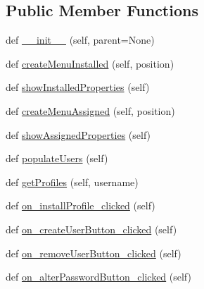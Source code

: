 \subsection*{Public Member Functions}
\begin{DoxyCompactItemize}
\item 
def \mbox{\hyperlink{class_dsg_tools_1_1_user_tools_1_1user__profiles_1_1_manage_user_profiles_a1887fc986ce95413f9257b52fe64fbe0}{\+\_\+\+\_\+init\+\_\+\+\_\+}} (self, parent=None)
\item 
def \mbox{\hyperlink{class_dsg_tools_1_1_user_tools_1_1user__profiles_1_1_manage_user_profiles_a65349a082dd0ecd96d12504f393b9157}{create\+Menu\+Installed}} (self, position)
\item 
def \mbox{\hyperlink{class_dsg_tools_1_1_user_tools_1_1user__profiles_1_1_manage_user_profiles_a1beec4e431f3526c6f4efb5bcefca57d}{show\+Installed\+Properties}} (self)
\item 
def \mbox{\hyperlink{class_dsg_tools_1_1_user_tools_1_1user__profiles_1_1_manage_user_profiles_a72cd95fef31bdbb1a3cad168c691f9d8}{create\+Menu\+Assigned}} (self, position)
\item 
def \mbox{\hyperlink{class_dsg_tools_1_1_user_tools_1_1user__profiles_1_1_manage_user_profiles_a37b95df3524d16d437744c9a835251dd}{show\+Assigned\+Properties}} (self)
\item 
def \mbox{\hyperlink{class_dsg_tools_1_1_user_tools_1_1user__profiles_1_1_manage_user_profiles_aa6fc0358355aa3103a1186f1ee803757}{populate\+Users}} (self)
\item 
def \mbox{\hyperlink{class_dsg_tools_1_1_user_tools_1_1user__profiles_1_1_manage_user_profiles_a7a13c12726e9d7a6cb5d4692ab812be0}{get\+Profiles}} (self, username)
\item 
def \mbox{\hyperlink{class_dsg_tools_1_1_user_tools_1_1user__profiles_1_1_manage_user_profiles_a026d117030c803f78c6d5896e7a090ac}{on\+\_\+install\+Profile\+\_\+clicked}} (self)
\item 
def \mbox{\hyperlink{class_dsg_tools_1_1_user_tools_1_1user__profiles_1_1_manage_user_profiles_aa73f5b9db86127096b292eaf71e5b60a}{on\+\_\+create\+User\+Button\+\_\+clicked}} (self)
\item 
def \mbox{\hyperlink{class_dsg_tools_1_1_user_tools_1_1user__profiles_1_1_manage_user_profiles_a77ef40627addf8820512fc30a2d01ae2}{on\+\_\+remove\+User\+Button\+\_\+clicked}} (self)
\item 
def \mbox{\hyperlink{class_dsg_tools_1_1_user_tools_1_1user__profiles_1_1_manage_user_profiles_a7e0fe95a8a424f02874a61d98ae5ea56}{on\+\_\+alter\+Password\+Button\+\_\+clicked}} (self)

\end{DoxyCompactItemize}
